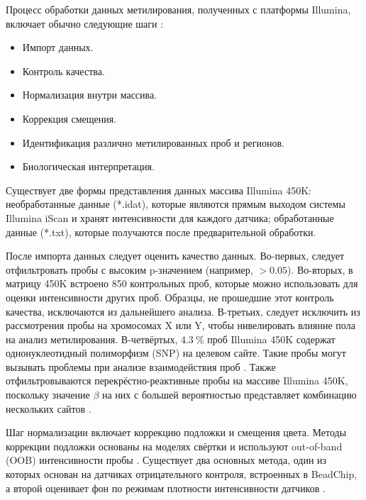 Процесс обработки данных метилирования, полученных с платформы Illumina, включает обычно следующие шаги \autocite{Wang2018}: 
\begin{itemize}
	\item Импорт данных.
	\item Контроль качества.
	\item Нормализация внутри массива.
	\item Коррекция смещения.
	\item Идентификация различно метилированных проб и регионов.
	\item Биологическая интерпретация.
\end{itemize}

Существует две формы представления данных массива Illumina 450K: необработанные данные (*.idat), которые являются прямым выходом системы Illumina iScan и хранят интенсивности для каждого датчика; обработанные данные (*.txt), которые получаются после предварительной обработки. 

После импорта данных следует оценить качество данных. Во-первых, следует отфильтровать пробы с высоким p-значением (например, $>0.05$). Во-вторых, в матрицу 450K встроено 850 контрольных проб, которые можно использовать для оценки интенсивности других проб. Образцы, не прошедшие этот контроль качества, исключаются из дальнейшего анализа. В-третьих, следует исключить из рассмотрения пробы на хромосомах X или Y, чтобы нивелировать влияние пола на анализ метилирования. В-четвёртых, $4.3~\%$ проб Illumina 450K содержат однонуклеотидный полиморфизм (SNP) на целевом сайте. Такие пробы могут вызывать проблемы при анализе взаимодействия проб \autocite{Price2013}. Также отфильтровываются перекрёстно-реактивные пробы на массиве Illumina 450K, поскольку значение $\beta$ на них с большей вероятностью представляет комбинацию нескольких сайтов \autocite{Zhou2016}.

Шаг нормализации включает коррекцию подложки и смещения цвета. Методы коррекции подложки основаны на моделях свёртки и используют out-of-band (OOB) интенсивности пробы \autocite{Triche2013}. Существует два основных метода, один из которых основан на датчиках отрицательного контроля, встроенных в BeadChip, а второй оценивает фон по режимам плотности интенсивности датчиков \autocite{Dedeurwaerder2011}. 

